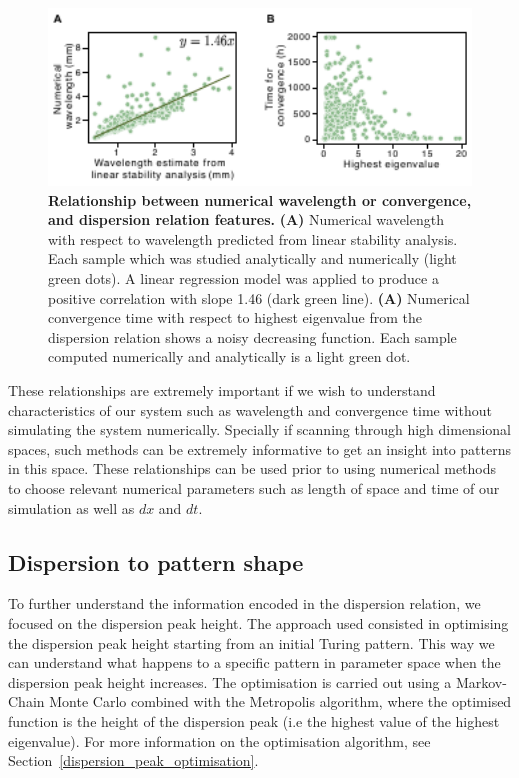 \begin{figure}[H] %
    \centering
    \includegraphics[width=1\textwidth]{chapters/Chapter 1/dispersion_to_wavelength_convergence} %
    \caption{\textbf{Relationship between numerical wavelength or convergence, and dispersion relation features.} \textbf{(A)} Numerical wavelength with respect to wavelength predicted from linear stability analysis. Each sample which was studied analytically and numerically (light green dots). A linear regression model was applied to produce a positive correlation with slope 1.46 (dark green line). \textbf{(A)} Numerical convergence time with respect to highest eigenvalue from the dispersion relation shows a noisy decreasing function. Each sample computed numerically and analytically is a light green dot.}
    \label{fig:dispersion_to_wavelength_convergence} %
\end{figure}

These relationships are extremely important if we wish to understand characteristics of our system such as wavelength and convergence time without simulating the system numerically.
Specially if scanning through high dimensional spaces, such methods can be extremely informative to get an insight into patterns in this space.
These relationships can be used prior to using numerical methods to choose relevant numerical parameters such as length of space and time of our simulation as well as $dx$ and $dt$.

\subsection{Dispersion to pattern shape}
To further understand the information encoded in the dispersion relation, we focused on the dispersion peak height.
The approach used consisted in optimising the dispersion peak height starting from an initial Turing pattern.
This way we can understand what happens to a specific pattern in parameter space when the dispersion peak height increases.
The optimisation is carried out using a Markov-Chain Monte Carlo combined with the Metropolis algorithm, where the optimised function is the height of the dispersion peak (i.e the highest value of the highest eigenvalue).
For more information on the optimisation algorithm, see Section~\ref{dispersion_peak_optimisation}.


